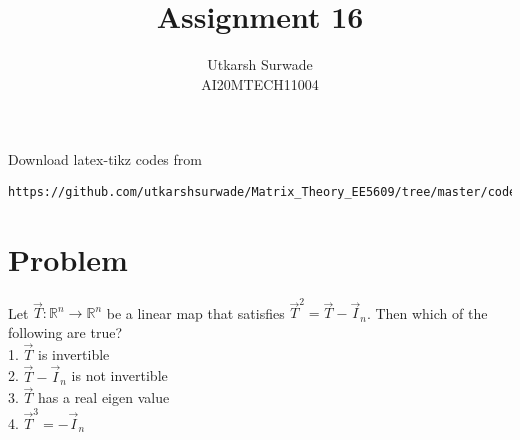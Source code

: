 \documentclass[journal,12pt]{IEEEtran}
\begin{document}
\def\putbox#1#2#3{\makebox[0in][l]{\makebox[#1][l]{}\raisebox{\baselineskip}[0in][0in]{\raisebox{#2}[0in][0in]{#3}}}}
     \def\rightbox#1{\makebox[0in][r]{#1}}
     \def\centbox#1{\makebox[0in]{#1}}
     \def\topbox#1{\raisebox{-\baselineskip}[0in][0in]{#1}}
     \def\midbox#1{\raisebox{-0.5\baselineskip}[0in][0in]{#1}}
\vspace{3cm}
\title{Assignment 16}
\author{Utkarsh Surwade\\AI20MTECH11004}
\maketitle
\bigskip
\renewcommand{\thefigure}{\theenumi}
\renewcommand{\thetable}{\theenumi}
Download latex-tikz codes from 
%
\begin{lstlisting}
https://github.com/utkarshsurwade/Matrix_Theory_EE5609/tree/master/codes
\end{lstlisting}
%
 
\section{\textbf{Problem}}
Let $\vec{T}:\mathbb{R}^n \rightarrow \mathbb{R}^n$ be a linear map that satisfies $\vec{T}^2=\vec{T}-\vec{I}_{n}$. Then which of the following are true?\\
1. $\vec{T}$ is invertible\\
2. $\vec{T}-\vec{I}_{n}$ is not invertible\\
3. $\vec{T}$ has a real eigen value\\
4. $\vec{T}^3=-\vec{I}_{n}$\\
\end{document}
